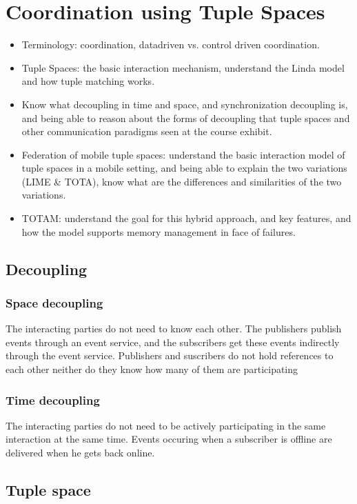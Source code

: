 \documentclass[a4paper]{report}
\begin{document}
\chapter{Coordination using Tuple Spaces}
\begin{itemize}
  \item Terminology: coordination, datadriven vs. control driven coordination.
  \item Tuple Spaces: the basic interaction mechanism, understand the Linda model and how tuple matching works.
  \item Know what decoupling in time and space, and synchronization decoupling is, and being able to reason about the forms of decoupling that tuple spaces and other communication paradigms seen at the course exhibit.
  \item Federation of mobile tuple spaces: understand the basic interaction model of tuple spaces in a mobile setting, and being able to explain the two variations (LIME \& TOTA), know what are the differences and similarities of the two variations.
  \item TOTAM: understand the goal for this hybrid approach, and key features, and how the model supports memory management in face of failures.
\end{itemize}
\section{Decoupling}

\subsection{Space decoupling}

The interacting parties do not need to know each other. The publishers publish events through an event service, and the subscribers get these events indirectly through the event service. Publishers and suscribers do not hold references to each other neither do they know how many of them are participating

\subsection{Time decoupling}

The interacting parties do not need to be actively participating in the same interaction at the same time. Events occuring when a subscriber is offline are delivered when he gets back online.

\section{Tuple space}
\end{document}
